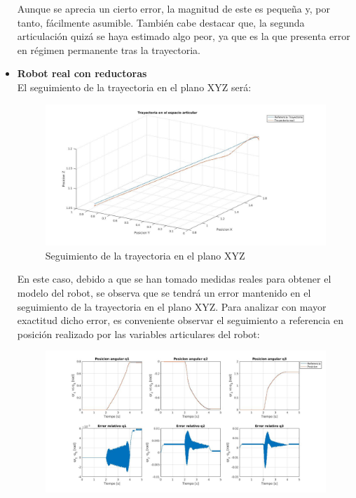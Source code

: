 \begin{itemize}
	
	
	
	
	Aunque se aprecia un cierto error, la magnitud de este es pequeña y, por tanto, fácilmente asumible. También cabe destacar que, la segunda articulación quizá se haya estimado algo peor, ya que es la que presenta error en régimen permanente tras la trayectoria. \\
	
	
	
	\item \textbf{Robot real con reductoras} \\
	
	El seguimiento de la trayectoria en el plano XYZ será:
	
	
	
	\begin{figure}[h!]
		
		\centering
		
		\includegraphics[width=.8\textwidth]{exp3_trayPDreal}
		
		\caption{Seguimiento de la trayectoria en el plano XYZ}
		
	\end{figure}
	
	
	
	En este caso, debido a que se han tomado medidas reales para obtener el modelo del robot, se observa que se tendrá un error mantenido en el seguimiento de la trayectoria en el plano XYZ. Para analizar con mayor exactitud dicho error, es conveniente observar el seguimiento a referencia en posición realizado por las variables articulares del robot:
	
	
	
	\begin{figure}[h!]
		
		\centering
		
		\includegraphics[width=.8\textwidth]{exp3_posPDrealCR}
		

\end{figure}
\end{itemize}
